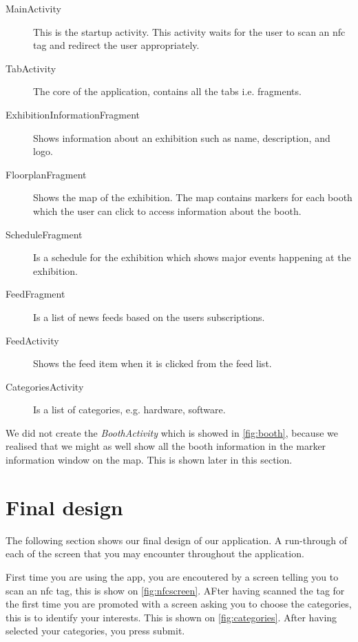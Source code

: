 \begin{description}
\item[MainActivity] This is the startup activity. This activity waits for the user to scan an \ac{nfc} tag and redirect the user appropriately.
\item[TabActivity] The core of the application, contains all the tabs i.e. fragments.
\item[ExhibitionInformationFragment] Shows information about an exhibition such as name, description, and logo.
\item[FloorplanFragment] Shows the map of the exhibition. The map contains markers for each booth which the user can click to access information about the booth.
\item[ScheduleFragment] Is a schedule for the exhibition which shows major events happening at the exhibition.
\item[FeedFragment] Is a list of news feeds based on the users subscriptions.
\item[FeedActivity] Shows the feed item when it is clicked from the feed list.
\item[CategoriesActivity] Is a list of categories, e.g. hardware, software.
\end{description}
We did not create the \textit{BoothActivity} which is showed in \autoref{fig:booth}, because we realised that we might as well show all the booth information in the marker information window on the map. This is shown later in this section.

\section*{Final design}
The following section shows our final design of our application. A run-through of each of the screen that you may encounter throughout the application.

First time you are using the app, you are encoutered by a screen telling you to scan an \ac{nfc} tag, this is show on \autoref{fig:nfcscreen}. AFter having scanned the tag for the first time you are promoted with a screen asking you to choose the categories, this is to identify your interests. This is shown on \autoref{fig:categories}. After having selected your categories, you press submit.

